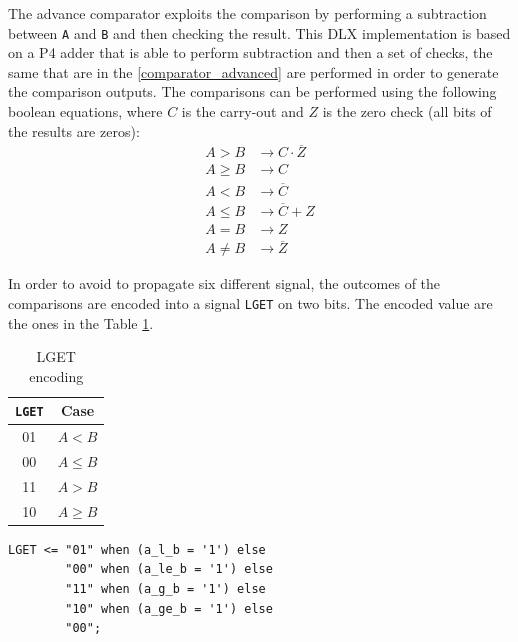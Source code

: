 The advance comparator exploits the comparison by performing a subtraction between \texttt{A} and \texttt{B} and then checking the result. This DLX implementation is based on a P4 adder that is able to perform subtraction and then a set of checks, the same that are in the \ref{comparator_advanced} are performed in order to generate the comparison outputs. The comparisons can be performed using the following boolean equations, where $C$ is the carry-out and $Z$ is the zero check (all bits of the results are zeros):
\begin{align*}
	A > B &\rightarrow C \cdot \overline{Z}\\
	A \geq B &\rightarrow C\\
	A < B  &\rightarrow \overline{C}\\
	A \leq B &\rightarrow \overline{C} + Z\\
	A = B &\rightarrow Z\\
	A \neq B  &\rightarrow \overline{Z} 
\end{align*}

 In order to avoid to propagate six different signal, the outcomes of the comparisons are encoded into a signal \texttt{LGET} on two bits. The encoded value are the ones in the Table \ref{tab:lget}.
 \begin{multicols}{2}
 	\begin{table}[H]
 		\begin{center}
 			\begin{tabular}{ c| c}
 				\texttt{LGET} & Case\\
 				\hline
 				01 & $A < B$ \\
 				00 & $A \leq B$ \\
 				11 & $A > B$ \\
 				10 & $A \geq B$
 				
 			\end{tabular}
 			\caption{LGET encoding}
 			\label{tab:lget}
 		\end{center}
 	\end{table}
 	
 	\columnbreak
 	
 	\begin{lstlisting}[style=vhdl,caption={VHDL code for the encodig},label=lget_code]
 	LGET <= "01" when (a_l_b = '1') else
	 	"00" when (a_le_b = '1') else 
	 	"11" when (a_g_b = '1') else
	 	"10" when (a_ge_b = '1') else
	 	"00";
 	\end{lstlisting}
 \end{multicols}

